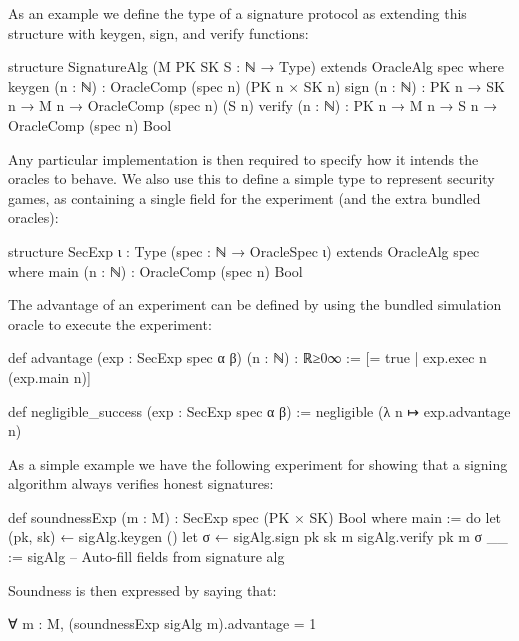 As an example we define the type of a signature protocol as extending this structure with keygen, sign, and verify functions:
\begin{leancode}
  structure SignatureAlg (M PK SK S : ℕ → Type) extends OracleAlg spec where
    keygen (n : ℕ) : OracleComp (spec n) (PK n × SK n)
    sign (n : ℕ) : PK n → SK n → M n → OracleComp (spec n) (S n)
    verify (n : ℕ) : PK n → M n → S n → OracleComp (spec n) Bool
\end{leancode}
Any particular implementation is then required to specify how it intends the oracles to behave.
We also use this to define a simple type to represent security games,
  as containing a single field for the experiment (and the extra bundled oracles):
\begin{leancode}
  structure SecExp {ι : Type} (spec : ℕ → OracleSpec ι)
      extends OracleAlg spec where
    main (n : ℕ) : OracleComp (spec n) Bool
\end{leancode}
The advantage of an experiment can be defined by using the bundled simulation oracle to execute the experiment:
\begin{leancode}
  def advantage (exp : SecExp spec α β) (n : ℕ) : ℝ≥0∞ :=
    [= true | exp.exec n (exp.main n)]

  def negligible_success (exp : SecExp spec α β) :=
    negligible (λ n ↦ exp.advantage n)
\end{leancode}

As a simple example we have the following experiment for showing that a signing algorithm  always verifies honest signatures:
\begin{leancode}
  def soundnessExp (m : M) : SecExp spec (PK × SK) Bool where
    main := do
      let (pk, sk) ← sigAlg.keygen ()
      let σ ← sigAlg.sign pk sk m
      sigAlg.verify pk m σ
    __ := sigAlg -- Auto-fill fields from signature alg
\end{leancode}
Soundness is then expressed by saying that:
\begin{leancode}
  ∀ m : M, (soundnessExp sigAlg m).advantage = 1
\end{leancode}

